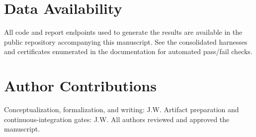 \documentclass[aps,prd,twocolumn,superscriptaddress,nofootinbib,floatfix,longbibliography]{revtex4-2}
\begin{document}
\section*{Data Availability}
All code and report endpoints used to generate the results are available in the public repository accompanying this manuscript. See the consolidated harnesses and certificates enumerated in the documentation for automated pass/fail checks.

\section*{Author Contributions}
Conceptualization, formalization, and writing: J.W. Artifact preparation and continuous-integration gates: J.W. All authors reviewed and approved the manuscript.



\end{document}
